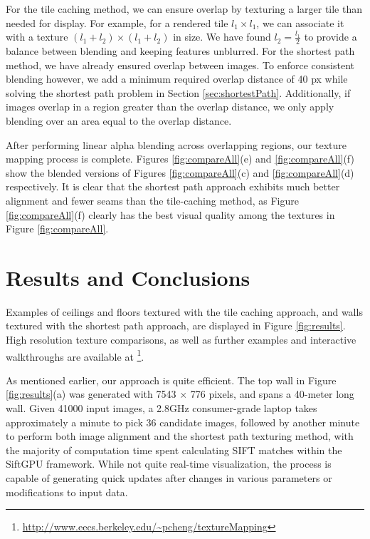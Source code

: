 \documentclass[]{spie}  %
\begin{document}
For the tile caching method, we can ensure overlap by texturing a
larger tile than needed for display. For example, for a rendered tile
$l_1 \times l_1$, we can associate it with a texture $(l_1 + l_2)
\times (l_1 + l_2)$ in size.  We have found $l_2 = \frac{l_1}{2}$ to
provide a balance between blending and keeping features unblurred. For
the shortest path method, we have already ensured overlap between
images. To enforce consistent blending however, we add a minimum
required overlap distance of 40 px while solving the shortest path
problem in Section \ref{sec:shortestPath}. Additionally, if images
overlap in a region greater than the overlap distance, we only apply
blending over an area equal to the overlap distance.

After performing linear alpha blending across overlapping regions, our
texture mapping process is complete. Figures \ref{fig:compareAll}(e)
and \ref{fig:compareAll}(f) show the blended versions of Figures
\ref{fig:compareAll}(c) and \ref{fig:compareAll}(d) respectively. It
is clear that the shortest path approach exhibits much better
alignment and fewer seams than the tile-caching method, as Figure
\ref{fig:compareAll}(f) clearly has the best visual quality among the
textures in Figure \ref{fig:compareAll}.

\section{Results and Conclusions}
\label{sec:resultsAndConclusions}
Examples of ceilings and floors textured with the tile caching
approach, and walls textured with the shortest path approach, are
displayed in Figure \ref{fig:results}. High resolution texture
comparisons, as well as further examples and interactive walkthroughs are
available at \footnote{\url{http://www.eecs.berkeley.edu/~pcheng/textureMapping}}.

As mentioned earlier, our approach is quite efficient. The top wall in
Figure \ref{fig:results}(a) was generated with 7543 $\times$ 776
pixels, and spans a 40-meter long wall. Given 41000 input images, a
2.8GHz consumer-grade laptop takes approximately a minute to pick 36
candidate images, followed by another minute to perform both image
alignment and the shortest path texturing method, with the majority of
computation time spent calculating SIFT matches within the SiftGPU
framework. While not quite real-time visualization, the process is
capable of generating quick updates after changes in various
parameters or modifications to input data.
\end{document}
